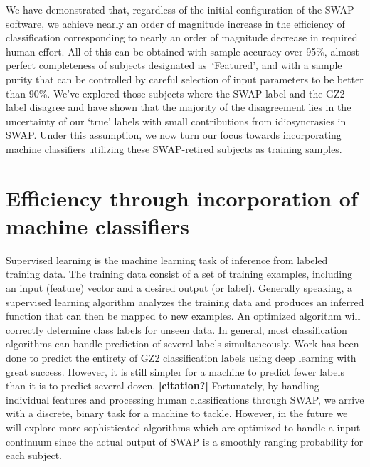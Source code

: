 \documentclass[twocolumn]{aastex6}
\newcommand{\feat}{`Featured'}
\begin{document}
We have demonstrated that, regardless of the initial configuration of the SWAP 
software, we achieve nearly an order of magnitude increase in the efficiency of 
classification corresponding to nearly an order of magnitude decrease in
required human effort. All of this can be obtained with sample accuracy over 95\%, 
almost perfect completeness of subjects designated as~\feat, and with a sample purity
that can be controlled by careful selection of input parameters to be better than 90\%. 
We've explored those subjects where the SWAP label and the GZ2 label disagree
and have shown that the majority of the disagreement lies in the uncertainty of 
our `true' labels with small contributions from idiosyncrasies in SWAP. 
Under this assumption, we now turn our focus towards incorporating machine
classifiers utilizing these SWAP-retired subjects as training samples. 


\section{Efficiency through incorporation of machine classifiers} \label{sec:machine}

Supervised learning is the machine learning task of inference from labeled 
training data. The training data consist of a set of training examples, including
an input (feature) vector and a desired output (or label).  Generally speaking,
a supervised learning algorithm analyzes the training data and produces an inferred 
function that can then be mapped to new examples. An optimized algorithm will 
correctly determine class labels for unseen data. In general, most classification 
algorithms can handle prediction of several labels simultaneously. Work has been
done to predict the entirety of GZ2 classification labels using deep learning 
\citep{Dieleman2015} with great success. However, it is still simpler for a machine
to predict fewer labels than it is to predict several dozen. \textbf{[citation?]} 
Fortunately, by handling individual features and processing human classifications
through SWAP, we arrive with a discrete, binary task for a machine to tackle.
However, in the future we will explore more sophisticated algorithms which 
are optimized to handle a input continuum since the actual output of SWAP
is a smoothly ranging probability for each subject. 
\end{document}

